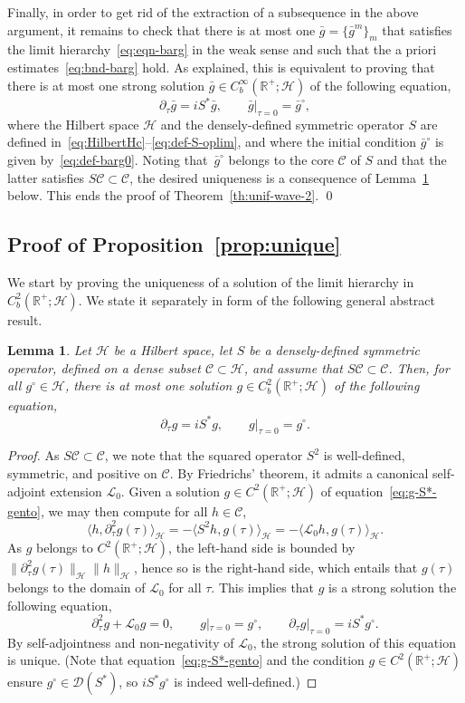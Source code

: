 \documentclass[a4paper,11pt,reqno,noindent]{amsart}
\theoremstyle{plain}
\newtheorem{lem}{Lemma}[section]
\numberwithin{equation}{section}
\newcommand{\R}{\mathbb R}
\newcommand{\Dc}{\mathcal D}
\newcommand{\Cc}{\mathcal C}
\newcommand{\Lc}{\mathcal L}
\newcommand{\Hc}{\mathcal H}
\newcommand{\3}{|\!|\!|}
\begin{document}
Finally, in order to get rid of the extraction of a subsequence in the above argument, it remains to check that there is at most one $\bar g=\{\bar g^m\}_m$ that satisfies the limit hierarchy~\eqref{eq:eqn-barg} in the weak sense and such that the a priori estimates~\eqref{eq:bnd-barg} hold.
As explained, this is equivalent to proving that there is at most one strong solution $\bar g\in C^\infty_b(\R^+;\Hc)$ of the following equation,
\[\partial_\tau\bar g=iS^*\bar g,\qquad\bar g|_{\tau=0}=\bar g^\circ,\]
where the Hilbert space $\Hc$ and the densely-defined symmetric operator $S$ are defined in~\eqref{eq:HilbertHc}--\eqref{eq:def-S-oplim}, and where the initial condition $\bar g^\circ$ is given by~\eqref{eq:def-barg0}.
Noting that~$\bar g^\circ$ belongs to the core $\Cc$ of $S$ and that the latter satisfies $S\Cc\subset\Cc$, the desired uniqueness is a consequence of Lemma~\ref{lem:unique-S} below.
This ends the proof of Theorem~\ref{th:unif-wave-2}.
\qed

\subsection{Proof of Proposition~\ref{prop:unique}}\label{sec:unique-pr}
We start by proving the uniqueness of a solution of the limit hierarchy in $C^2_b(\R^+;\Hc)$. We state it separately in form of the following general abstract result.

\begin{lem}\label{lem:unique-S}
Let $\Hc$ be a Hilbert space, let $S$ be a densely-defined symmetric operator, defined on a dense subset $\Cc\subset\Hc$, and assume that $S\Cc\subset\Cc$. Then, for all $g^\circ\in\Hc$, there is at most one solution $g\in C^2_b(\R^+;\Hc)$ of the following equation,
\begin{equation}\label{eq:g-S*-gento}
\partial_\tau g=iS^*g,\qquad g|_{\tau=0}=g^\circ.
\end{equation}
\end{lem}
\begin{proof}
As $S\Cc\subset\Cc$, we note that the squared operator $S^2$ is well-defined, symmetric, and positive on $\Cc$. By Friedrichs' theorem, it admits a canonical self-adjoint extension $\Lc_0$. Given a solution $g\in C^2(\R^+;\Hc)$ of equation~\eqref{eq:g-S*-gento}, we may then compute for all $h\in\Cc$,
\[\langle h,\partial_\tau^2g(\tau)\rangle_\Hc=-\langle S^2h,g(\tau)\rangle_\Hc=-\langle \Lc_0 h,g(\tau)\rangle_\Hc.\]
As $g$ belongs to $C^2(\R^+;\Hc)$, the left-hand side is bounded by $\|\partial_\tau^2g(\tau)\|_\Hc\|h\|_\Hc$, hence so is the right-hand side, which entails that $g(\tau)$ belongs to the domain of $\Lc_0$ for all $\tau$. This implies that $g$ is a strong solution the following equation,
\[\partial_\tau^2g+\Lc_0 g=0,\qquad g|_{\tau=0}=g^\circ,\qquad \partial_\tau g|_{\tau=0}=iS^*g^\circ.\]
By self-adjointness and non-negativity of $\Lc_0$, the strong solution of this equation is unique.
(Note that equation~\eqref{eq:g-S*-gento} and the condition $g\in C^2(\R^+;\Hc)$ ensure $g^\circ\in\Dc(S^*)$, so $iS^*g^\circ$ is indeed well-defined.)
\end{proof}
\end{document}
